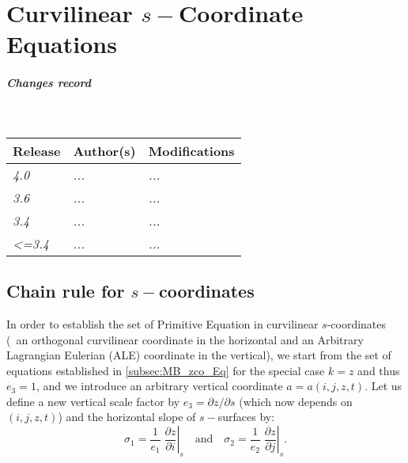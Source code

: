 \documentclass[../main/NEMO_manual]{subfiles}
\begin{document}
\chapter{Curvilinear $s-$Coordinate Equations}
\label{apdx:SCOORD}


\thispagestyle{plain}

\chaptertoc

\paragraph{Changes record} ~\\

{\footnotesize
  \begin{tabularx}{\textwidth}{l||X|X}
    Release & Author(s) & Modifications \\
    \hline
    {\em   4.0} & {\em ...} & {\em ...} \\
    {\em   3.6} & {\em ...} & {\em ...} \\
    {\em   3.4} & {\em ...} & {\em ...} \\
    {\em <=3.4} & {\em ...} & {\em ...}
  \end{tabularx}
}

\clearpage

\section{Chain rule for $s-$coordinates}
\label{sec:SCOORD_chain}

In order to establish the set of Primitive Equation in curvilinear $s$-coordinates
(\ie\ an orthogonal curvilinear coordinate in the horizontal and
an Arbitrary Lagrangian Eulerian (ALE) coordinate in the vertical),
we start from the set of equations established in \autoref{subsec:MB_zco_Eq} for
the special case $k = z$ and thus $e_3 = 1$,
and we introduce an arbitrary vertical coordinate $a = a(i,j,z,t)$.
Let us define a new vertical scale factor by $e_3 = \partial z / \partial s$ (which now depends on $(i,j,z,t)$) and
the horizontal slope of $s-$surfaces by:
\begin{equation}
  \label{eq:SCOORD_s_slope}
  \sigma_1 =\frac{1}{e_1 } \; \left. {\frac{\partial z}{\partial i}} \right|_s
  \quad \text{and} \quad
  \sigma_2 =\frac{1}{e_2 } \; \left. {\frac{\partial z}{\partial j}} \right|_s .
\end{equation}
\end{document}
